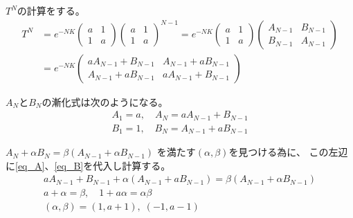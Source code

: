 \documentclass[12pt,b5paper]{ltjsarticle}
\begin{document}
\begin{enumerate}
\begin{enumerate}
            \dotfill


            $T^{N}$の計算をする。
            \begin{align}
             T^{N}
             &= e^{-NK}
             \begin{pmatrix}
              a & 1 \\ 1 & a
             \end{pmatrix}
             \begin{pmatrix}
              a & 1 \\ 1 & a
             \end{pmatrix}^{\!\!N-1}
             = e^{-NK}
             \begin{pmatrix}
              a & 1 \\ 1 & a
             \end{pmatrix}
             \begin{pmatrix}
              A_{N-1} & B_{N-1} \\ B_{N-1} & A_{N-1}
             \end{pmatrix}\\
             &= e^{-NK}
             \begin{pmatrix}
              aA_{N-1}+B_{N-1} & A_{N-1}+aB_{N-1} \\
              A_{N-1}+aB_{N-1} & aA_{N-1}+B_{N-1}
             \end{pmatrix}
            \end{align}

            $A_{N}$と$B_{N}$の漸化式は次のようになる。
            \begin{gather}
             A_{1}=a ,\quad
             A_{N} = aA_{N-1}+B_{N-1} \label{eq_A} \\
             B_{1}=1 ,\quad
             B_{N} = A_{N-1}+aB_{N-1} \label{eq_B}
            \end{gather}

      $A_{N}+\alpha B_{N} = \beta (A_{N-1}+\alpha B_{N-1})$
      を満たす$(\alpha,\beta)$を見つける為に、
      この左辺に\eqref{eq_A}、\eqref{eq_B}を代入し計算する。
      \begin{gather}
       aA_{N-1}+B_{N-1} +\alpha (A_{N-1}+aB_{N-1})
        = \beta (A_{N-1}+\alpha B_{N-1})\\
       a + \alpha = \beta ,\quad 1+a\alpha = \alpha\beta\\
       (\alpha,\beta) = (1,a+1),\;(-1,a-1)
      \end{gather}


\end{enumerate}
\end{enumerate}
\end{document}
